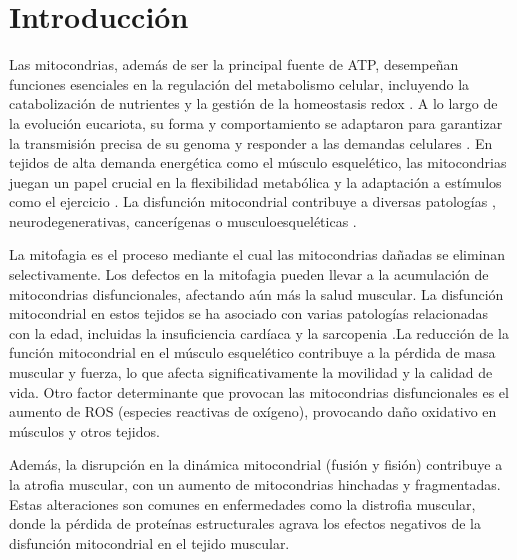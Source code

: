 
\section{Introducción}

Las mitocondrias, además de ser la principal fuente de ATP, desempeñan funciones esenciales en la regulación del metabolismo celular, incluyendo la catabolización de nutrientes y la gestión de la homeostasis redox \cite{Spinelli2018}. A lo largo de la evolución eucariota, su forma y comportamiento se adaptaron para garantizar la transmisión precisa de su genoma y responder a las demandas celulares \cite{Friedman2014}. En tejidos de alta demanda energética como el músculo esquelético, las mitocondrias juegan un papel crucial en la flexibilidad metabólica y la adaptación a estímulos como el ejercicio \cite{Memme2021, Smith2023}. La disfunción mitocondrial contribuye a diversas patologías \cite{QuintanaCabrera2023}, neurodegenerativas, cancerígenas \cite{Chan2020} o musculoesqueléticas \cite{Liu2017}.


La mitofagia es el proceso mediante el cual las mitocondrias dañadas se eliminan selectivamente. Los defectos en la mitofagia pueden llevar a la acumulación de mitocondrias disfuncionales, afectando aún más la salud muscular. \cite{Leudec}
La disfunción mitocondrial \cite{chen} en estos tejidos se ha asociado con varias patologías relacionadas con la edad, incluidas la insuficiencia cardíaca y la sarcopenia \cite{Boengler} .La reducción de la función mitocondrial en el músculo esquelético contribuye a la pérdida de masa muscular y fuerza, lo que afecta significativamente la movilidad y la calidad de vida.
Otro factor determinante que provocan las mitocondrias disfuncionales es el aumento de ROS (especies reactivas de oxígeno), provocando daño oxidativo en músculos y otros tejidos. \cite{java}

Además, la disrupción en la dinámica mitocondrial (fusión y fisión) contribuye a la atrofia muscular, con un aumento de mitocondrias hinchadas y fragmentadas. Estas alteraciones son comunes en enfermedades como la distrofia muscular, donde la pérdida de proteínas estructurales agrava los efectos negativos de la disfunción mitocondrial en el tejido muscular.

